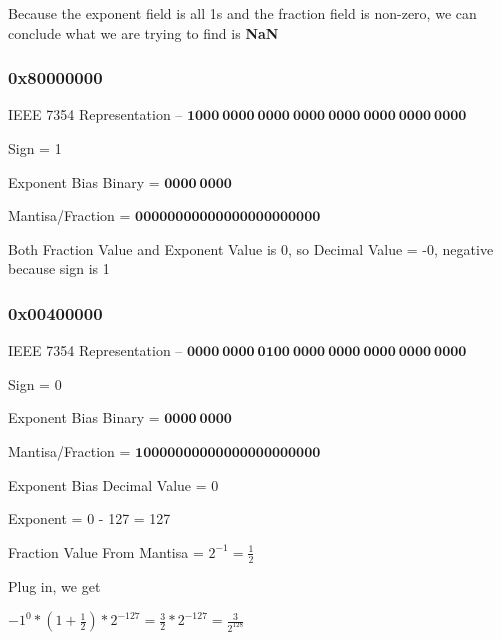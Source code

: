 \documentclass{article}
\newcommand{\boxedanswer}[1]{%

    \fbox{\large\textbf{#1}}%
}
\begin{document}
    Because the exponent field is all 1s and the fraction field is non-zero, we can conclude what we are trying to find is \textbf{NaN}

    \vspace*{0.1in}

    \boxedanswer{NaN(Not a Number)}

    \subsubsection*{0x80000000}

    IEEE 7354 Representation -- $\mathbf{1000\:0000\:0000\:0000\:0000\:0000\:0000\:0000}$

    Sign = 1

    Exponent Bias Binary = $\mathbf{0000\:0000}$

    Mantisa/Fraction = $\mathbf{00000000000000000000000}$

    Both Fraction Value and Exponent Value is 0, so Decimal Value = -0, negative because sign is 1

    \boxedanswer{-0}

    \subsubsection*{0x00400000}

    IEEE 7354 Representation -- $\mathbf{0000\: 0000\: 0100\: 0000\:0000\:0000\:0000\:0000}$

    Sign = 0

    Exponent Bias Binary = $\mathbf{0000\:0000}$

    Mantisa/Fraction = $\mathbf{10000000000000000000000}$

    Exponent Bias Decimal Value = 0

    Exponent = 0 - 127 = 127

    Fraction Value From Mantisa = $2^{-1} = \frac{1}{2}$

    Plug in, we get 

    $-1^0 * (1+\frac{1}{2}) * 2^{-127} = \frac{3}{2} * 2^{-127} = \frac{3}{2^{128}}$ \hspace*{0.3in} 
\end{document}
